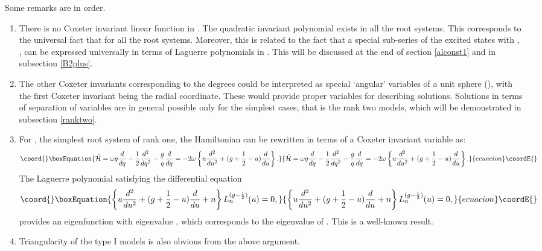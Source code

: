\documentclass[a4paper,12pt]{article}
\begin{document}
\bigskip
Some remarks are in order.
\begin{enumerate}
\item
  There is no Coxeter invariant linear
  function in \coordHE{}.
  The quadratic invariant polynomial \coordHE{} exists in all the
  root systems. This corresponds to the universal fact that
  \coordHE{} for all the root systems.
  Moreover, this is related to the fact that a special sub-series of
  the excited states with \coordHE{}, \coordHE{} \coordHE{}, can be
  expressed universally in terms of Laguerre polynomials in \coordHE{}.
  This will be discussed at the end of section \ref{alconst1} and in
  subsection
  \ref{B2plus}.
\item
  The other Coxeter invariants corresponding to the degrees
\coordHE{}
  could be interpreted as special  `angular' variables of a unit sphere
  \coordHE{} (\coordHE{}), with the first Coxeter
invariant \coordHE{} being the
  radial coordinate.
  These would provide proper variables for describing solutions.
  Solutions in terms of
  separation of variables are in general possible only for the simplest
  cases, that is the rank two models, which will be demonstrated in
  subsection \ref{ranktwo}.
\item
  For \coordHE{}, the simplest root system of rank one, the Hamiltonian
  \coordHE{} can be rewritten in terms of a Coxeter invariant
variable
  \coordHE{} as:
  \begin{equation}\coord{}\boxEquation{
     \tilde{\cal H}=\omega
     q{d\over{dq}}-{1\over2}{d^2\over{dq^2}}-{g\over{q}}{d\over{dq}}
=-2\omega\left\{u{d^2\over{du^2}}+(g+{1\over2}-u){d\over{du}}\right\}.
     }{
     \tilde{\cal H}=\omega
     q{d\over{dq}}-{1\over2}{d^2\over{dq^2}}-{g\over{q}}{d\over{dq}}
=-2\omega\left\{u{d^2\over{du^2}}+(g+{1\over2}-u){d\over{du}}\right\}.
     }{ecuacion}\coordE{}\end{equation}
     The Laguerre polynomial satisfying the differential equation
     \begin{equation}\coord{}\boxEquation{
     \left\{u{d^2\over{du^2}}+(g+{1\over2}-u){d\over{du}}+n\right\}
    L_n^{(g-{1\over2})}(u)=0,
     \label{lagueeq}
  }{
     \left\{u{d^2\over{du^2}}+(g+{1\over2}-u){d\over{du}}+n\right\}
    L_n^{(g-{1\over2})}(u)=0,
     }{ecuacion}\coordE{}\end{equation}
  provides an eigenfunction with eigenvalue \coordHE{}, which corresponds
  to the eigenvalue \coordHE{} of \coordHE{}.
  This is a well-known result.
\item
  Triangularity of the type I models is also obvious from the above
  argument.
\end{enumerate}
\end{document}
